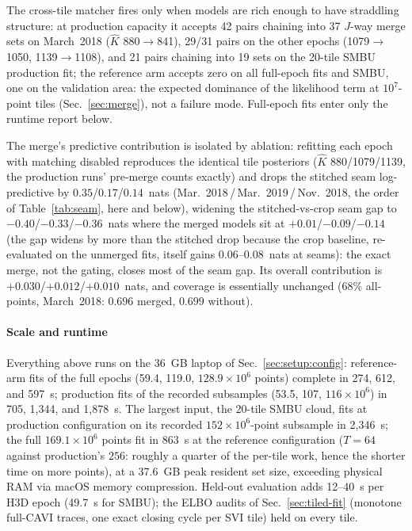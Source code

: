  The cross-tile matcher fires only when models are rich enough to have
straddling structure: at production capacity it accepts 42 pairs
chaining into 37 $J$-way merge sets on March~2018 ($\hat{K}$
880${\to}$841), 29/31 pairs on the other epochs (1079${\to}$1050,
1139${\to}$1108), and 21 pairs chaining into 19 sets on the 20-tile
SMBU production fit; the reference arm accepts zero on all full-epoch fits
and SMBU, one on the validation area: the expected dominance of the
likelihood term at $10^{7}$-point tiles (Sec.~\ref{sec:merge}), not a
failure mode. Full-epoch fits enter only the runtime report below.

 The merge's predictive contribution is isolated by ablation: refitting
each epoch with matching disabled reproduces the identical tile
posteriors ($\hat{K}$ 880/1079/1139, the production runs' pre-merge
counts exactly) and drops the stitched seam log-predictive by
$0.35$/$0.17$/$0.14$~nats (Mar.~2018\,/\,Mar.~2019\,/\,Nov.~2018, the
order of Table~\ref{tab:seam}, here and below),
widening the stitched-vs-crop seam gap to $-0.40$/$-0.33$/$-0.36$~nats
where the merged models sit at $+0.01$/$-0.09$/$-0.14$ (the gap widens
by more than the stitched drop because the crop baseline, re-evaluated
on the unmerged fits, itself gains $0.06$--$0.08$~nats at seams): the
exact merge, not the gating, closes most of the seam gap. Its overall
contribution is $+0.030$/$+0.012$/$+0.010$~nats, and coverage is
essentially unchanged (68\% all-points, March~2018: $0.696$ merged,
$0.699$ without).

\paragraph{Scale and runtime}
\label{sec:results:capacity-scale}
 Everything above runs on the 36~GB laptop of
Sec.~\ref{sec:setup:config}: reference-arm fits of the full epochs
(59.4, 119.0, $128.9\times10^{6}$ points) complete in 274, 612, and
597~s; production fits of the recorded subsamples (53.5, 107,
$116\times10^{6}$) in 705, 1{,}344, and 1{,}878~s. The largest input,
the 20-tile SMBU cloud, fits at production configuration on its
recorded $152\times10^{6}$-point subsample in 2{,}346~s; the full
$169.1\times10^{6}$ points fit in 863~s at the reference
configuration ($T=64$ against production's $256$: roughly a quarter
of the per-tile work, hence the shorter time on more points), at a
37.6~GB peak resident set size, exceeding physical RAM via
macOS memory compression. Held-out
evaluation adds 12--40~s per H3D epoch (49.7~s for SMBU); the ELBO
audits of Sec.~\ref{sec:tiled-fit} (monotone full-CAVI traces, one
exact closing cycle per SVI tile) held on every tile.

